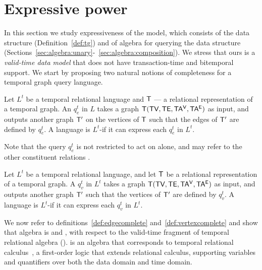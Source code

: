 \section{Expressive power}
\label{sec:formal}

In this section we study expressiveness of the \tg model, which
consists of the \tg data structure (Definition~\ref{def:tg}) and of
\tg algebra for querying the data structure
(Sections~\ref{sec:algebra:unary}-~\ref{sec:algebra:composition}).  We
stress that ours is a {\em valid-time data model} that does not have
transaction-time and bitemporal support.  We start by proposing two
natural notions of completeness for a temporal graph query language.

\begin{definition}
  Let $L^t$ be a temporal relational language and $\mathsf{T}$ --- a
  relational representation of a temporal graph.  An \edgeq $q^t_e$ in
  $L$ takes a graph $\mathsf{T} (\textsf{TV}, \textsf{TE}, \mathsf{TA^{V}}, \mathsf{TA^{E}})$ as input, and
  outputs another graph $\mathsf{T}'$ on the vertices of $\mathsf{T}$ such that
  the edges of $\mathsf{T}'$ are defined by $q^t_e$.  A language is
  $L^t$-\edgec if it can express each $q^t_e$ in $L^t$.
  \label{def:edgecomplete}
\end{definition}

Note that the query $q^t_e$ is not restricted to act on \te alone, and
may refer to the other constituent relations \tve.


\begin{definition}
  Let $L^t$ be a temporal relational language, and let $\mathsf{T}$ be a
  relational representation of a temporal graph.  A \vertexq $q^t_v$
  in $L^t$ takes a graph $\mathsf{T} (\textsf{TV}, \textsf{TE}, \mathsf{TA^{V}}, \mathsf{TA^{E}})$ as input, and
  outputs another graph $\mathsf{T}'$ such that the vertices of $\mathsf{T}'$ are
  defined by $q^t_v$. A language is $L^t$-\vertexc if it can express
  each $q^t_v$ in $L^t$.
\label{def:vertexcomplete}
\end{definition}

We now refer to definitions~\ref{def:edgecomplete}
and~\ref{def:vertexcomplete} and show that \ql algebra is \edgec and
\vertexc, with respect to the valid-time fragment of temporal
relational algebra (\tra).  \tra is an algebra that corresponds to
temporal relational calculus~\cite{DBLP:reference/db/ChomickiT09b}, a
first-order logic that extends relational calculus, supporting
variables and quantifiers over both the data domain and time domain.

